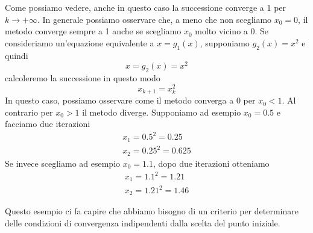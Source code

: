 \begin{example}
\begin{center}
	\end{center}
	Come possiamo vedere, anche in questo caso la successione converge a 1 per $k \to +\infty$. In generale
	possiamo osservare che, a meno che non scegliamo $x_0 = 0$, il metodo converge sempre a 1 anche se scegliamo
	$x_0$ molto vicino a 0. Se consideriamo un'equazione equivalente a $x = g_1(x)$, supponiamo $g_2(x) = x^2$
	e quindi
	\[ x = g_2(x) = x^2 \]
	calcoleremo la successione in questo modo
	\[ x_{k+1} = x_k^2 \]
	In questo caso, possiamo osservare come il metodo converga a 0 per $x_0 < 1$. Al contrario per $x_0 > 1$ il
	metodo diverge. Supponiamo ad esempio $x_0 = 0.5$ e facciamo due iterazioni
	\begin{gather*}
		x_1 = 0.5^2 = 0.25 \\
		x_2 = 0.25^2 = 0.625
	\end{gather*}
	Se invece scegliamo ad esempio $x_0 = 1.1$, dopo due iterazioni otteniamo
	\begin{gather*}
		x_1 = 1.1^2 = 1.21 \\
		x_2 = 1.21^2 = 1.46
	\end{gather*}
\end{example}

Questo esempio ci fa capire che abbiamo bisogno di un criterio per determinare delle condizioni di convergenza
indipendenti dalla scelta del punto iniziale.